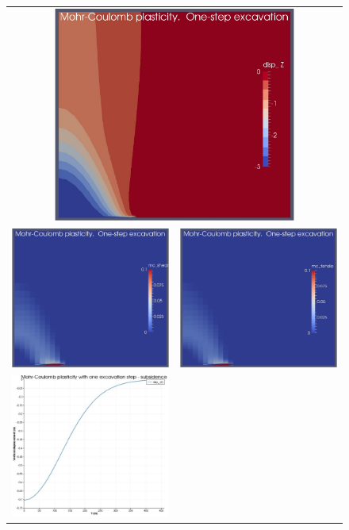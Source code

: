 \documentclass[]{scrreprt}
\begin{document}
\begin{figure}[p]
\begin{center}
\begin{tabular}{cc}
\multicolumn{2}{c}{\includegraphics[width=8cm]{mc_only_one_step_disp.pdf}}
  \\
\includegraphics[width=6cm]{mc_only_one_step_shear.pdf} &
\includegraphics[width=6cm]{mc_only_one_step_tensile.pdf} \\
\includegraphics[width=6cm]{mc_only_one_step_subsidence.pdf} &

\end{tabular}
\end{center}
\end{figure}
\end{document}

